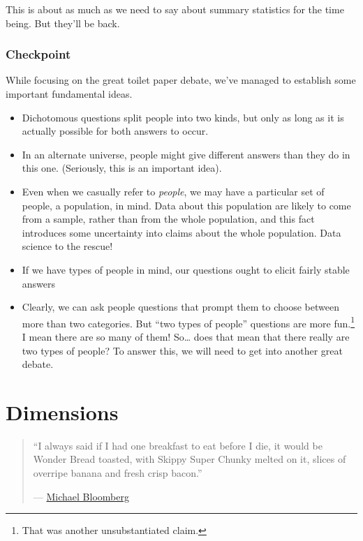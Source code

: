\documentclass[openany]{book}
\begin{document}
This is about as much as we need to say about summary statistics for the time being. But they'll be back.

\hypertarget{checkpoint}{%
\subsection*{Checkpoint}\label{checkpoint}}

While focusing on the great toilet paper debate, we've managed to establish some important fundamental ideas.

\begin{itemize}
\item
  Dichotomous questions split people into two kinds, but only as long as it is actually possible for both answers to occur.
\item
  In an alternate universe, people might give different answers than they do in this one. (Seriously, this is an important idea).
\item
  Even when we casually refer to \emph{people}, we may have a particular set of people, a population, in mind. Data about this population are likely to come from a sample, rather than from the whole population, and this fact introduces some uncertainty into claims about the whole population. Data science to the rescue!
\item
  If we have types of people in mind, our questions ought to elicit fairly stable answers
\item
  Clearly, we can ask people questions that prompt them to choose between more than two categories. But ``two types of people'' questions are more fun.\footnote{That was another unsubstantiated claim.} I mean there are so many of them! So\ldots{} does that mean that there really are two types of people? To answer this, we will need to get into another great debate.
\end{itemize}

\hypertarget{dimensions}{%
\chapter{Dimensions}\label{dimensions}}

\begin{quote}
``I always said if I had one breakfast to eat before I die, it would be Wonder Bread toasted, with Skippy Super Chunky melted on it, slices of overripe banana and fresh crisp bacon.''

--- \href{https://nypost.com/2008/07/26/mayors-last-meal-is-a-killer/}{Michael Bloomberg}
\end{quote}
\end{document}
